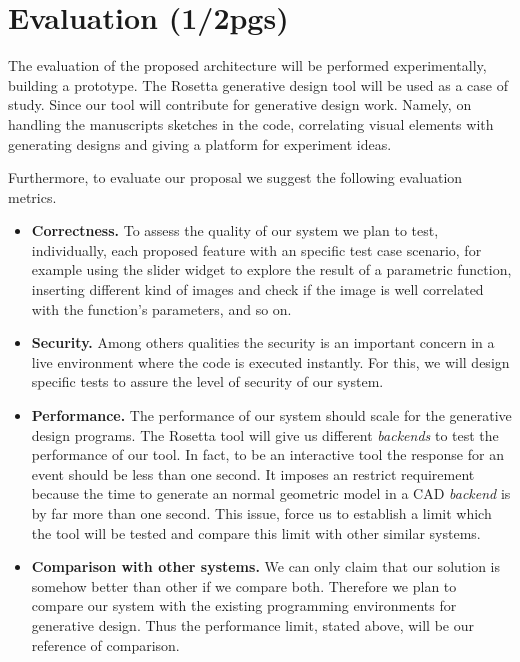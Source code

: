 
% 
% 
\section{Evaluation (1/2pgs)}
\label{sec:eval}

The evaluation of the proposed architecture will be performed experimentally, building a prototype. The Rosetta generative design tool will be used as a case of study. Since our tool will contribute for generative design work. Namely, on handling the manuscripts sketches in the code, correlating visual elements with generating designs and giving a platform for experiment ideas.

Furthermore, to evaluate our proposal we suggest the following evaluation metrics.

\begin{itemize}
\item \textbf{Correctness.} To assess the quality of our system we plan to test, individually, each proposed feature with an specific test case scenario, for example using the slider widget to explore the result of a parametric function, inserting different kind of images and check if the image is well correlated with the function's parameters, and so on. 

\item \textbf{Security.} Among others qualities the security is an important concern in a live environment where the code is executed instantly. For this, we will design specific tests to assure the level of security of our system.

\item \textbf{Performance.} The performance of our system should scale for the generative design programs. The Rosetta tool will give us different \textit{backends} to test the performance of our tool. In fact, to be an interactive tool the response for an event should be less than one second. It imposes an restrict requirement because the time to generate an normal geometric model in a CAD \textit{backend} is by far more than one second. This issue, force us to establish a limit which the tool will be tested and compare this limit with other similar systems.

\item \textbf{Comparison with other systems.} We can only claim that our solution is somehow better than other if we compare both. Therefore we plan to compare our system with the existing programming environments for generative design. Thus the performance limit, stated above, will be our reference of comparison.
\end{itemize}
